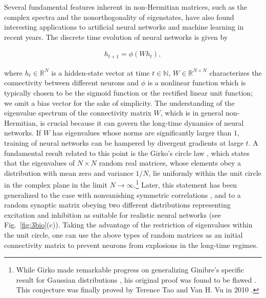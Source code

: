 \documentclass{tADP2e}
\theoremstyle{plain}
\newcommand{\eqn}[1]{
\begin{eqnarray}
	#1
\end{eqnarray}
}
\theoremstyle{plain}
\theoremstyle{definition}
\begin{document}
\vspace{3pt}
\noindent
Several fundamental features inherent in non-Hermitian matrices, such as the complex spectra and the nonorthogonality of eigenstates, have also found interesting applications to artificial neural networks and machine learning in recent years. The discrete time evolution of neural networks is given by
\eqn{
h_{t+1}=\phi(Wh_{t}),
}
where $h_t\in{\mathbb R}^{N}$ is a hidden-state vector at time $t\in{\mathbb N}$, $W\in{\mathbb R}^{N\times N}$ characterizes the connectivity between different neurons and $\phi$ is a nonlinear function which is typically chosen to be the sigmoid function or the rectified linear unit function; we omit a bias vector for the sake of simplicity. The understanding of the eigenvalue spectrum of the connectivity matrix $W$, which is in general non-Hermitian, is crucial because it can govern the long-time dynamics of neural networks. If $W$ has eigenvalues whose norms are significantly larger than $1$, training of neural networks can be hampered by divergent gradients at large $t$.  A fundamental result related to this point is the Girko's circle law \cite{GVL85}, which states that the eigenvalues of $N\times N$ random real matrices, whose elements obey a distribution with mean zero and variance $1/N$, lie uniformly within the unit circle in the complex plane in the limit $N\to\infty$.\footnote{While Girko made remarkable progress on generalizing Ginibre's specific result for Gaussian distributions \cite{JG65}, his original proof was found to be flawed \cite{BZD97}. This conjecture was finally proved by Terence Tao and Van H. Vu in 2010 \cite{TT10}.} Later, this statement has been generalized to the case with nonvanishing symmetric correlations \cite{SHJ88}, and to a random synaptic matrix obeying two different distributions representing excitation and inhibition as suitable for realistic neural networks \cite{RK06} (see Fig.~\ref{fig:3bio}(c)). 
Taking the advantage of the restriction of eigenvalues within the unit circle,
 one can use the above types of random matrices as an initial connectivity matrix to prevent neurons from explosions in the long-time regimes. 
\end{document}
